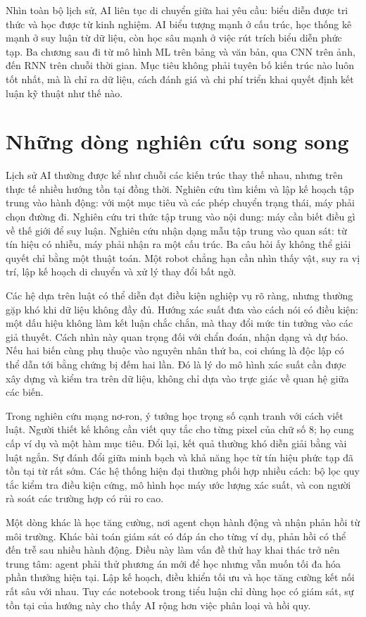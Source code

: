 \documentclass[12pt,a4paper]{report}
\begin{document}
Nhìn toàn bộ lịch sử, AI liên tục di chuyển giữa hai yêu cầu: biểu diễn được tri thức và học được từ kinh nghiệm. AI biểu tượng mạnh ở cấu trúc, học thống kê mạnh ở suy luận từ dữ liệu, còn học sâu mạnh ở việc rút trích biểu diễn phức tạp. Ba chương sau đi từ mô hình ML trên bảng và văn bản, qua CNN trên ảnh, đến RNN trên chuỗi thời gian. Mục tiêu không phải tuyên bố kiến trúc nào luôn tốt nhất, mà là chỉ ra dữ liệu, cách đánh giá và chi phí triển khai quyết định kết luận kỹ thuật như thế nào.

\section{Những dòng nghiên cứu song song}
Lịch sử AI thường được kể như chuỗi các kiến trúc thay thế nhau, nhưng trên thực tế nhiều hướng tồn tại đồng thời. Nghiên cứu tìm kiếm và lập kế hoạch tập trung vào hành động: với một mục tiêu và các phép chuyển trạng thái, máy phải chọn đường đi. Nghiên cứu tri thức tập trung vào nội dung: máy cần biết điều gì về thế giới để suy luận. Nghiên cứu nhận dạng mẫu tập trung vào quan sát: từ tín hiệu có nhiễu, máy phải nhận ra một cấu trúc. Ba câu hỏi ấy không thể giải quyết chỉ bằng một thuật toán. Một robot chẳng hạn cần nhìn thấy vật, suy ra vị trí, lập kế hoạch di chuyển và xử lý thay đổi bất ngờ.

Các hệ dựa trên luật có thể diễn đạt điều kiện nghiệp vụ rõ ràng, nhưng thường gặp khó khi dữ liệu không đầy đủ. Hướng xác suất đưa vào cách nói có điều kiện: một dấu hiệu không làm kết luận chắc chắn, mà thay đổi mức tin tưởng vào các giả thuyết. Cách nhìn này quan trọng đối với chẩn đoán, nhận dạng và dự báo. Nếu hai biến cùng phụ thuộc vào nguyên nhân thứ ba, coi chúng là độc lập có thể dẫn tới bằng chứng bị đếm hai lần. Đó là lý do mô hình xác suất cần được xây dựng và kiểm tra trên dữ liệu, không chỉ dựa vào trực giác về quan hệ giữa các biến.

Trong nghiên cứu mạng nơ-ron, ý tưởng học trọng số cạnh tranh với cách viết luật. Người thiết kế không cần viết quy tắc cho từng pixel của chữ số 8; họ cung cấp ví dụ và một hàm mục tiêu. Đổi lại, kết quả thường khó diễn giải bằng vài luật ngắn. Sự đánh đổi giữa minh bạch và khả năng học từ tín hiệu phức tạp đã tồn tại từ rất sớm. Các hệ thống hiện đại thường phối hợp nhiều cách: bộ lọc quy tắc kiểm tra điều kiện cứng, mô hình học máy ước lượng xác suất, và con người rà soát các trường hợp có rủi ro cao.

Một dòng khác là học tăng cường, nơi agent chọn hành động và nhận phản hồi từ môi trường. Khác bài toán giám sát có đáp án cho từng ví dụ, phản hồi có thể đến trễ sau nhiều hành động. Điều này làm vấn đề thử hay khai thác trở nên trung tâm: agent phải thử phương án mới để học nhưng vẫn muốn tối đa hóa phần thưởng hiện tại. Lập kế hoạch, điều khiển tối ưu và học tăng cường kết nối rất sâu với nhau. Tuy các notebook trong tiểu luận chỉ dùng học có giám sát, sự tồn tại của hướng này cho thấy AI rộng hơn việc phân loại và hồi quy.
\end{document}

